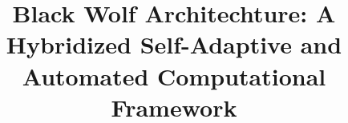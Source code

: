 \documentclass[conference]{IEEEtran}
\begin{document}
\title{Black Wolf Architechture: A Hybridized Self-Adaptive and Automated Computational Framework\\
}


\maketitle
\end{document}
